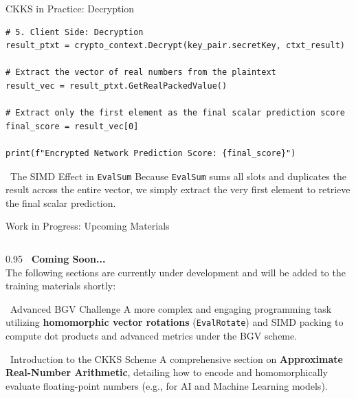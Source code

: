 \documentclass[aspectratio=169, 10pt]{beamer}
\begin{document}
\begin{frame}[fragile]{CKKS in Practice: Decryption}
\vspace{0.1cm}
\begin{lstlisting}[firstnumber=40]
# 5. Client Side: Decryption
result_ptxt = crypto_context.Decrypt(key_pair.secretKey, ctxt_result)

# Extract the vector of real numbers from the plaintext
result_vec = result_ptxt.GetRealPackedValue()

# Extract only the first element as the final scalar prediction score
final_score = result_vec[0]

print(f"Encrypted Network Prediction Score: {final_score}")
\end{lstlisting}
\vspace{0.2cm}
\begin{block}{\faLightbulb \ The SIMD Effect in \texttt{EvalSum}}
\small Because \texttt{EvalSum} sums all slots and duplicates the result across the entire vector, we simply extract the very first element to retrieve the final scalar prediction.
\end{block}
\end{frame}



\begin{frame}{Work in Progress: Upcoming Materials}
\begin{columns}[T]
\begin{column}{0.95\textwidth}
    \Large \textbf{\textcolor{DeepBlue}{\faTools \ Coming Soon...}} \\
    \normalsize \vspace{0.3cm}
    The following sections are currently under development and will be added to the training materials shortly:
    \vspace{0.4cm}

    \begin{block}{\faKeyboard \ Advanced BGV Challenge}
    \small
    A more complex and engaging programming task utilizing \textbf{homomorphic vector rotations} (\texttt{EvalRotate}) and SIMD packing to compute dot products and advanced metrics under the BGV scheme.
    \end{block}

    \vspace{0.2cm}
    \begin{exampleblock}{\faBrain \ Introduction to the CKKS Scheme}
    \small
    A comprehensive section on \textbf{Approximate Real-Number Arithmetic}, detailing how to encode and homomorphically evaluate floating-point numbers (e.g., for AI and Machine Learning models).
    \end{exampleblock}
\end{column}
\end{columns}
\end{frame}
\end{document}
